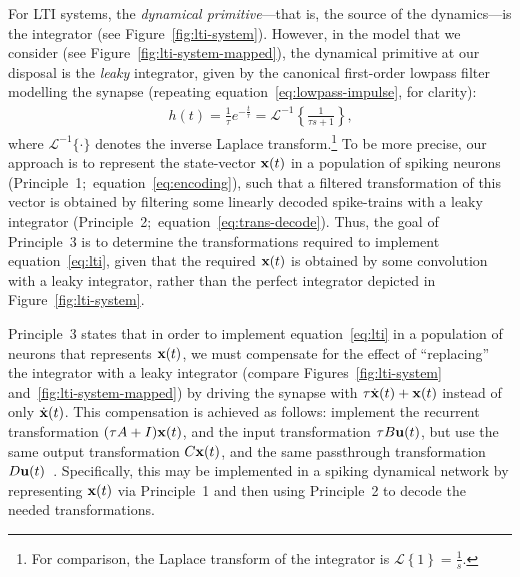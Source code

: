 For LTI systems, the \emph{dynamical primitive}---that is, the source of the dynamics---is the integrator (see Figure~\ref{fig:lti-system}).
However, in the model that we consider (see Figure~\ref{fig:lti-system-mapped}), the dynamical primitive at our disposal is the \emph{leaky} integrator, given by the canonical first-order lowpass filter modelling the synapse (repeating equation~\ref{eq:lowpass-impulse}, for clarity):
\begin{align} \label{eq:lowpass-laplace}
h(t) = \frac{1}{\tau} e^{-\frac{t}{\tau}} = \mathcal{L}^{-1}\left\{ \frac{1}{\tau s + 1} \right\} \text{,}
\end{align}
where $\mathcal{L}^{-1}\{ \cdot \}$ denotes the inverse Laplace transform.\footnote{
For comparison, the Laplace transform of the integrator is $\mathcal{L}\left\{ 1 \right\} = \frac{1}{s}$.}
To be more precise, our approach is to represent the state-vector $\mathbf{x}(t)$ in a population of spiking neurons (Principle~1;~equation~\ref{eq:encoding}), such that a filtered transformation of this vector is obtained by filtering some linearly decoded spike-trains with a leaky integrator (Principle~2;~equation~\ref{eq:trans-decode}).
Thus, the goal of Principle~3 is to determine the transformations required to implement equation~\ref{eq:lti}, given that the required $\mathbf{x}(t)$ is obtained by some convolution with a leaky integrator, rather than the perfect integrator depicted in Figure~\ref{fig:lti-system}.

Principle~3 states that in order to implement equation~\ref{eq:lti} in a population of neurons that represents $\mathbf{x}(t)$, we must compensate for the effect of ``replacing'' the integrator with a leaky integrator (compare Figures~\ref{fig:lti-system} and~\ref{fig:lti-system-mapped}) by driving the synapse with $\tau \dot{\mathbf{x}}(t) + \mathbf{x}(t)$ instead of only $\dot{\mathbf{x}}(t)$.
This compensation is achieved as follows: implement the recurrent transformation $(\tau A + I)\mathbf{x}(t)$, and the input transformation $\tau B \mathbf{u}(t)$, but use the same output transformation $C\mathbf{x}(t)$, and the same passthrough transformation $D\mathbf{u}(t)$~\citep[][pp.~221--225]{eliasmith2003a}.
Specifically, this may be implemented in a spiking dynamical network by representing $\mathbf{x}(t)$ via Principle~1 and then using Principle~2 to decode the needed transformations.

